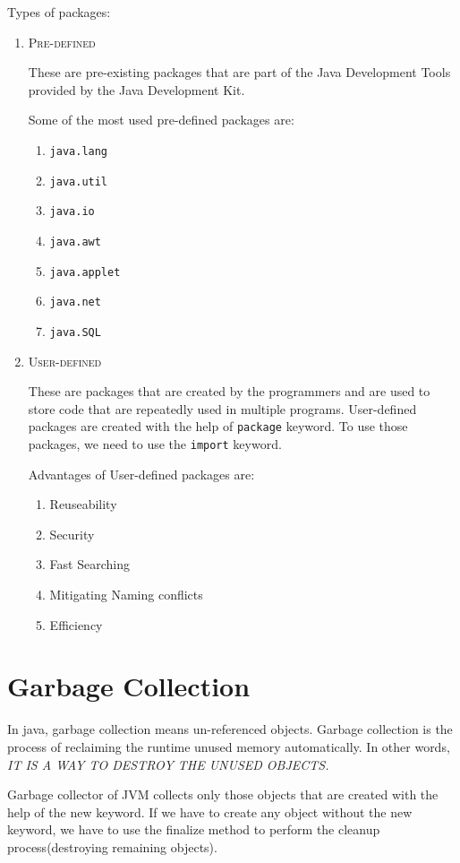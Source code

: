 \documentclass[a4paper, 12pt]{scrarticle}
\begin{document}
Types of packages:
\begin{enumerate}
  \item \textsc{Pre-defined}

    These are pre-existing packages that are part of the Java Development Tools provided by the Java Development Kit.

    Some of the most used pre-defined packages are:

    \begin{enumerate}
      \item \texttt{java.lang}
      \item \texttt{java.util}
      \item \texttt{java.io}
      \item \texttt{java.awt}
      \item \texttt{java.applet}
      \item \texttt{java.net}
      \item \texttt{java.SQL}
    \end{enumerate}

  \item \textsc{User-defined}

    These are packages that are created by the programmers and are used to store code that are repeatedly used in multiple programs. User-defined packages are created with the help of \verb+package+ keyword. To use those packages, we need to use the \verb+import+ keyword.

    Advantages of User-defined packages are:
    \begin{enumerate}
      \item Reuseability
      \item Security
      \item Fast Searching
      \item Mitigating Naming conflicts
      \item Efficiency
    \end{enumerate}
\end{enumerate}

\section{Garbage Collection}
In java, garbage collection means un-referenced objects. Garbage collection is the process of  reclaiming the runtime unused memory automatically. In other words, \emph{IT IS A WAY TO DESTROY THE UNUSED OBJECTS.}

Garbage collector of JVM collects only those objects that are created with the help of the new keyword. If we have to create any object without the new keyword, we have to use the finalize method to perform the cleanup process(destroying remaining objects).
\end{document}
